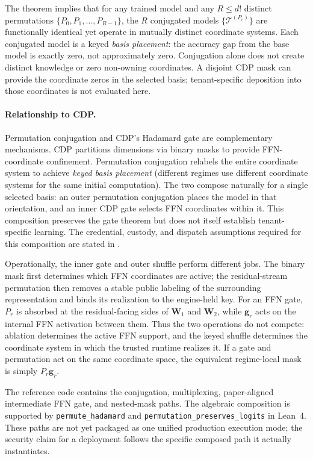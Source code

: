 \documentclass[11pt,a4paper]{article}
\newcommand{\bW}{\mathbf{W}}
\newcommand{\bg}{\mathbf{g}}
\begin{document}
The theorem implies that for any trained model and any $R \leq d!$
distinct permutations $\{P_0, P_1, \ldots, P_{R-1}\}$, the $R$
conjugated models $\{\mathcal{T}^{(P_r)}\}$ are functionally
identical yet operate in mutually distinct coordinate systems.
Each conjugated model is a keyed \emph{basis placement}: the
accuracy gap from the base model is exactly zero, not approximately
zero.  Conjugation alone does not create distinct knowledge or
zero non-owning coordinates.  A disjoint CDP mask can provide the
coordinate zeros in the selected basis; tenant-specific deposition
into those coordinates is not evaluated here.

\paragraph{Relationship to CDP.}
Permutation conjugation and CDP's Hadamard gate are complementary
mechanisms.  CDP partitions dimensions via binary masks to
provide FFN-coordinate confinement.  Permutation
conjugation relabels the entire coordinate system to achieve
\emph{keyed basis placement} (different regimes use different
coordinate systems for the same initial computation).  The two compose
naturally for a single selected basis: an outer permutation
conjugation places the model in that orientation, and an inner CDP
gate selects FFN coordinates within it.  This composition preserves
the gate theorem but does not itself establish tenant-specific
learning.
The credential, custody, and dispatch assumptions required for this
composition are stated in .

Operationally, the inner gate and outer shuffle perform
different jobs.  The binary mask first determines which FFN
coordinates are active;
the residual-stream permutation then removes a stable public
labeling of the surrounding representation and binds its
realization to the engine-held key.  For an FFN gate, $P_r$ is
absorbed at the residual-facing sides of $\bW_1$ and $\bW_2$,
while $\bg_r$ acts on the internal FFN activation between them.
Thus the two operations do not compete: ablation determines
the active FFN support, and the keyed shuffle determines
the coordinate system in which the trusted runtime realizes it.
If a gate and permutation act on the same coordinate space, the
equivalent regime-local mask is simply $P_r\bg_r$.

The reference code contains the conjugation, multiplexing,
paper-aligned intermediate FFN gate, and nested-mask paths.  The
algebraic composition is supported by
\texttt{permute\_hadamard} and
\texttt{permutation\_preserves\_logits} in Lean~4.  These paths are
not yet packaged as one unified production execution mode; the
security claim for a deployment follows the specific composed path
it actually instantiates.
\end{document}
